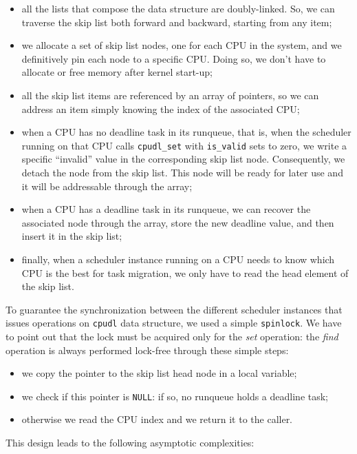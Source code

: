 \begin{itemize}
\item all the lists that compose the data structure are doubly-linked. So, we can
traverse the skip list both forward and backward, starting from any item;
\item we allocate a set of skip list nodes, one for each CPU in the system, and
we definitively pin each node to a specific CPU. Doing so, we don't have to allocate
or free memory after kernel start-up;
\item all the skip list items are referenced by an array of pointers, so we can 
address an item simply knowing the index of the associated CPU;
\item when a CPU has no deadline task in its runqueue, that is, when the scheduler
running on that CPU calls \texttt{cpudl\_set} with \texttt{is\_valid} sets to zero,
we write a specific ``invalid'' value in the corresponding skip list node.
Consequently, we detach the node from the skip list.
This node will be ready for later use and it will be addressable through the array;
\item when a CPU has a deadline task in its runqueue, we can recover the associated
node through the array, store the new deadline value, and then insert it in
the skip list;
\item finally, when a scheduler instance running on a CPU needs to know which
CPU is the best for task migration, we only have to read the head element of
the skip list.
\end{itemize}

To guarantee the synchronization between the different scheduler instances that
issues operations on \texttt{cpudl} data structure, we used a simple 
\texttt{spinlock}. We have to point out that the lock must be acquired only for
the \emph{set} operation: the \emph{find} operation is always performed lock-free through
these simple steps:

\begin{itemize}
\item we copy the pointer to the skip list head node in a local variable;
\item we check if this pointer is \texttt{NULL}: if so, no runqueue holds
a deadline task;
\item otherwise we read the CPU index and we return it to the caller.
\end{itemize}

This design leads to the following asymptotic complexities:

